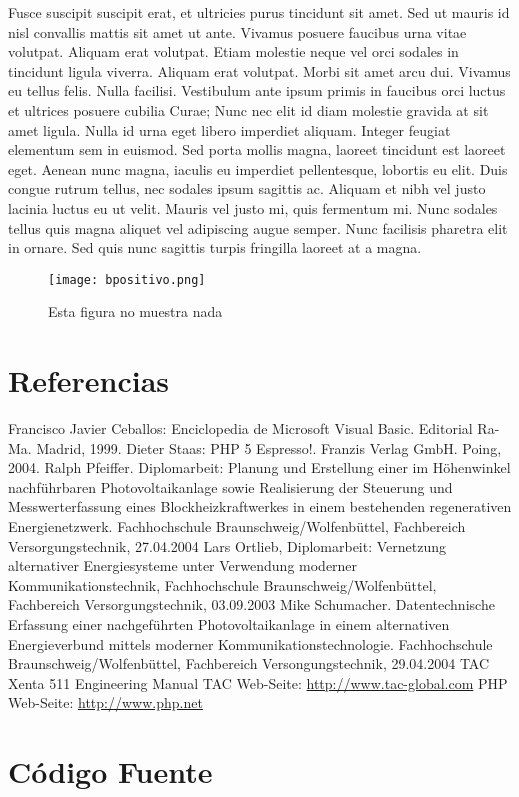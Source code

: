 \documentclass[twocolumn,a4paper,10pt]{article}
\begin{document}
Fusce suscipit suscipit erat, et ultricies purus tincidunt sit amet. Sed ut mauris id nisl convallis mattis sit amet ut ante. Vivamus posuere faucibus urna vitae volutpat. Aliquam erat volutpat. Etiam molestie neque vel orci sodales in tincidunt ligula viverra. Aliquam erat volutpat. Morbi sit amet arcu dui. Vivamus eu tellus felis.
Nulla facilisi. Vestibulum ante ipsum primis in faucibus orci luctus et ultrices posuere cubilia Curae; Nunc nec elit id diam molestie gravida at sit amet ligula. Nulla id urna eget libero imperdiet aliquam. Integer feugiat elementum sem in euismod. Sed porta mollis magna, laoreet tincidunt est laoreet eget. Aenean nunc magna, iaculis eu imperdiet pellentesque, lobortis eu elit. Duis congue rutrum tellus, nec sodales ipsum sagittis ac. Aliquam et nibh vel justo lacinia luctus eu ut velit. Mauris vel justo mi, quis fermentum mi. Nunc sodales tellus quis magna aliquet vel adipiscing augue semper. Nunc facilisis pharetra elit in ornare. Sed quis nunc sagittis turpis fringilla laoreet at a magna.
\begin{figure}
    \center \texttt{[image: bpositivo.png]}
    \caption{Esta figura no muestra nada}
\end{figure}


\section*{Referencias}
\begin{thebibliography}{99}
     Francisco Javier Ceballos: Enciclopedia de Microsoft Visual
        Basic. Editorial Ra-Ma. Madrid, 1999.
     Dieter Staas: PHP 5 Espresso!. Franzis Verlag GmbH.
        Poing, 2004.
     Ralph Pfeiffer. Diplomarbeit: Planung und
        Erstellung einer im Höhenwinkel nachführbaren Photovoltaikanlage
        sowie Realisierung der Steuerung und Messwerterfassung eines
        Blockheizkraftwerkes in einem bestehenden regenerativen
        Energienetzwerk. Fachhochschule Braunschweig/Wolfenbüttel,
        Fachbereich Versorgungstechnik, 27.04.2004
    Lars Ortlieb, Diplomarbeit: Vernetzung alternativer
        Energiesysteme unter Verwendung moderner Kommunikationstechnik,
        Fachhochschule Braunschweig/Wolfenbüttel, Fachbereich
        Versorgungstechnik, 03.09.2003
     Mike Schumacher. Datentechnische Erfassung einer
        nachgeführten Photovoltaikanlage in einem alternativen
        Energieverbund mittels moderner Kommunikationstechnologie.
        Fachhochschule Braunschweig/Wolfenbüttel, Fachbereich
        Versongungstechnik, 29.04.2004
     TAC Xenta 511 Engineering Manual
     TAC Web-Seite: \url{http://www.tac-global.com}
     PHP Web-Seite: \url{http://www.php.net}
\end{thebibliography}

\section*{Código Fuente}
    
\end{document}
